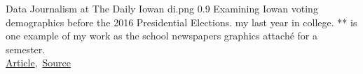 \cvexample
  {Data Journalism at The Daily Iowan}
  {di.png}
  {0.9}
  {%
    Examining Iowan voting demographics before the 2016 Presidential Elections.
    my last year in college.
    ** is one example of my work as the school newspapers graphics attaché for a semester.\\
    \raggedleft\href{http://daily-iowan.com/2016/11/02/el-voto/}{Article},\, \href{https://github.com/ryan-p-larson/DI-Hisp}{Source}
  }
